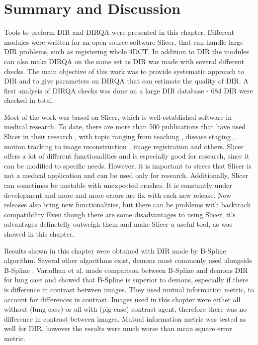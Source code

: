 \documentclass[type=dr, dr=rernat, accentcolor=tud7b,colorbacktitle, bigchapter, openright, twoside, 12pt ]{tudthesis}
\begin{document}
\section{Summary and Discussion}
\label{Summary}

Tools to preform DIR and DIRQA were presented in this chapter. Different modules were written for an open-source software Slicer, that can handle large DIR problems, such as registering whole 4DCT. In addition to DIR the modules can also make DIRQA on the same set as DIR was made with several different
checks. The main objective of this work was to provide systematic approach to DIR and to give parameters on DIRQA that can estimate the quality of DIR. A first analysis of DIRQA checks was done on a large DIR database - 684 DIR were checked in total.

Most of the work was based on Slicer, which is well-established software in medical research. To date, there are more than 500 publications that have used Slicer in their research \cite{SlicerCitation}, with topic ranging from 
teaching \cite{Pujol2016}, disease staging \cite{Liu2016, Liu2015}, motion tracking \cite{Behringer2015} to image reconstruction \cite{Meyer2015}, image registration \cite{Li2015, Fedorov2015, Li2015b}
and others. Slicer offers a lot of different functionalities and is especially good for research, since it can be modified to specific needs. However, it is important to stress that Slicer 
is not a medical application and can be used only for research. Additionally, Slicer can sometimes be unstable with unexpected crashes. It is constantly under development and more and more errors
are fix with each new release. New releases also bring new functionalities, but there can be problems with backtrack compatibility Even though there are some disadvantages to using Slicer, it's advantages
definetelly outweigh them and make Slicer a useful tool, as was showed in this chapter.

Results shown in this chapter were obtained with DIR made by B-Spline algorithm. Several other algorithms exist, demons most commonly used alongside B-Spline \cite{Thirion1998}. Varadhan et al. made comparison
between B-Spline and demons DIR for lung case \cite{Varadhan2013} and showed that B-Spline is superior to demons, especially if there is difference in contrast between images. They used mutual information
metric, to account for differences in contrast. Images used in this chapter were either all without (lung case) or all with (pig case) contrast agent, therefore there was no difference in contrast
between images. Mutual information metric was tested as well for DIR, however the results were much worse than mean square error metric.
\end{document}
